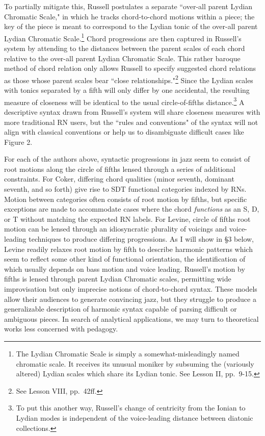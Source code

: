 To partially mitigate this, Russell postulates a separate ``over-all parent Lydian Chromatic Scale," in which he tracks chord-to-chord motions within a piece; the key of the piece is meant to correspond to the Lydian tonic of the over-all parent Lydian Chromatic Scale.\footnote{The Lydian Chromatic Scale is simply a somewhat-misleadingly named chromatic scale.  It receives its unusual moniker by subsuming the (variously altered) Lydian scales which share its Lydian tonic.  See Lesson II, pp.\ 9-15.}  Chord progressions are then captured in Russell's system by attending to the distances between the parent scales of each chord relative to the over-all parent Lydian Chromatic Scale.  This rather baroque method of chord relation only allows Russell to specify suggested chord relations as those whose parent scales bear ``close relationships."\footnote{See Lesson VIII, pp.\ 42ff.}  Since the Lydian scales with tonics separated by a fifth will only differ by one accidental, the resulting measure of closeness will be identical to the usual circle-of-fifths distance.\footnote{To put this another way, Russell's change of centricity from the Ionian to Lydian modes is independent of the voice-leading distance between diatonic collections.}  A descriptive syntax drawn from Russell's system will share closeness measures with more traditional RN users, but the ``rules and conventions" of the syntax will not align with classical conventions or help us to disambiguate difficult cases like Figure 2.

For each of the authors above, syntactic progressions in jazz seem to consist of root motions along the circle of fifths lensed through a series of additional constraints.  For Coker, differing chord qualities (minor seventh, dominant seventh, and so forth) give rise to SDT functional categories indexed by RNs.  Motion between categories often consists of root motion by fifths, but specific exceptions are made to accommodate cases where the chord \emph{functions} as an S, D, or T without matching the expected RN labels.  For Levine, circle of fifths root motion can be lensed through an idiosyncratic plurality of voicings and voice-leading techniques to produce differing progressions.  As I will show in \S 3 below, Levine readily relaxes root motion by fifth to describe harmonic patterns which seem to reflect some other kind of functional orientation, the identification of which usually depends on bass motion and voice leading.  Russell's motion by fifths is lensed through parent Lydian Chromatic scales, permitting wide improvisation but only imprecise notions of chord-to-chord syntax.  These models allow their audiences to generate convincing jazz, but they struggle to produce a generalizable description of harmonic syntax capable of parsing difficult or ambiguous pieces.  In search of analytical applications, we may turn to theoretical works less concerned with pedagogy.

